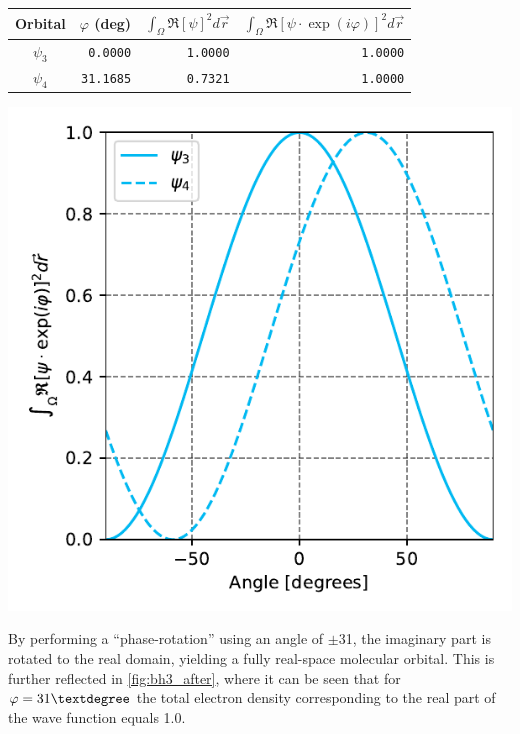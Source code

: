 \begin{Table}
    \label{tab:phase-rotation}
    \centering
    \begin{tabular}{|c|r|r|r|}
        \hline
        \textbf{Orbital} & \(\varphi\) (deg) & \(\int_{\Omega} \mathfrak{R}\left[\psi\right]^{2} d\vec{r}\) & \(\int_{\Omega} \mathfrak{R}\left[\psi \cdot \exp(i \varphi)\right]^{2} d\vec{r}\) \\
        \hline
        $\psi_{3}$ & \texttt{0.0000} & \texttt{1.0000} & \texttt{1.0000} \\
        \hline
        $\psi_{4}$ & \texttt{31.1685} & \texttt{0.7321} & \texttt{1.0000} \\
        \hline
    \end{tabular}    
\end{Table}

\begin{Figure}
    \centering
    \includegraphics[width=0.95\linewidth]{img/fig10.pdf}
    \label{fig:bh3_after}
\end{Figure}

By performing a ``phase-rotation'' using an angle of $\pm$31\textdegree, the imaginary part is rotated to the real domain, yielding a fully real-space molecular orbital. This is further reflected in \cref{fig:bh3_after}, where it can be seen that for $\varphi = 31\textdegree$ the total electron density corresponding to the real part of the wave function equals 1.0.